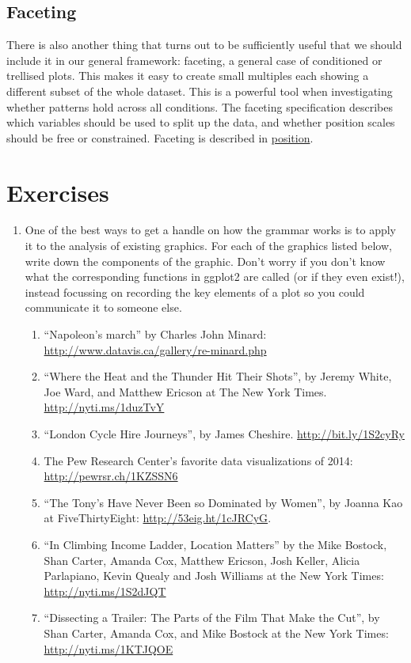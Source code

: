 \subsection{Faceting}\label{sub:intro-faceting}

There is also another thing that turns out to be sufficiently useful
that we should include it in our general framework: faceting, a general
case of conditioned or trellised plots. This makes it easy to create
small multiples each showing a different subset of the whole dataset.
This is a powerful tool when investigating whether patterns hold across
all conditions. The faceting specification describes which variables
should be used to split up the data, and whether position scales should
be free or constrained. Faceting is described in
\hyperref[cha:position]{position}.

\section{Exercises}

\begin{enumerate}
\def\labelenumi{\arabic{enumi}.}
\item
  One of the best ways to get a handle on how the grammar works is to
  apply it to the analysis of existing graphics. For each of the
  graphics listed below, write down the components of the graphic. Don't
  worry if you don't know what the corresponding functions in ggplot2
  are called (or if they even exist!), instead focussing on recording
  the key elements of a plot so you could communicate it to someone
  else.

  \begin{enumerate}
  \def\labelenumii{\arabic{enumii}.}
  \item
    ``Napoleon's march'' by Charles John Minard:
    \url{http://www.datavis.ca/gallery/re-minard.php}
  \item
    ``Where the Heat and the Thunder Hit Their Shots'', by Jeremy White,
    Joe Ward, and Matthew Ericson at The New York Times.
    \url{http://nyti.ms/1duzTvY}
  \item
    ``London Cycle Hire Journeys'', by James Cheshire.
    \url{http://bit.ly/1S2cyRy}
  \item
    The Pew Research Center's favorite data visualizations of 2014:
    \url{http://pewrsr.ch/1KZSSN6}
  \item
    ``The Tony's Have Never Been so Dominated by Women'', by Joanna Kao
    at FiveThirtyEight: \url{http://53eig.ht/1cJRCyG}.
  \item
    ``In Climbing Income Ladder, Location Matters'' by the Mike Bostock,
    Shan Carter, Amanda Cox, Matthew Ericson, Josh Keller, Alicia
    Parlapiano, Kevin Quealy and Josh Williams at the New York Times:
    \url{http://nyti.ms/1S2dJQT}
  \item
    ``Dissecting a Trailer: The Parts of the Film That Make the Cut'',
    by Shan Carter, Amanda Cox, and Mike Bostock at the New York Times:
    \url{http://nyti.ms/1KTJQOE}
  \end{enumerate}
\end{enumerate}

